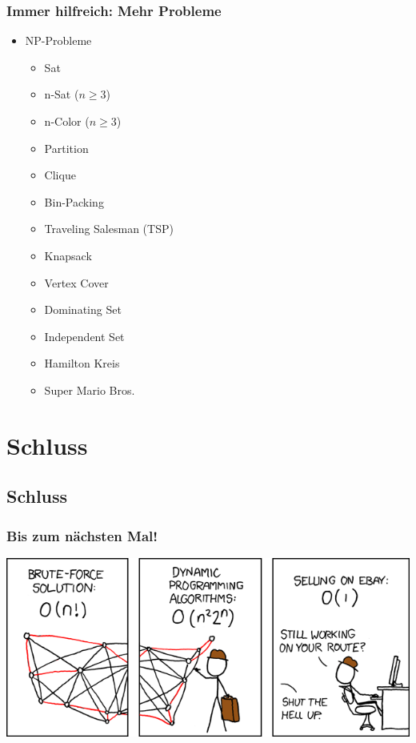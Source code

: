 \begin{frame}
	\frametitle{Immer hilfreich: Mehr Probleme}
	\begin{itemize}
		\item NP-Probleme
		\begin{itemize}
			\item Sat
			\item n-Sat ($n \geq 3$)
			\item n-Color ($n \geq 3$)
			\item Partition
			\item Clique
			\item Bin-Packing
			\item Traveling Salesman (TSP)
			\item Knapsack
			\item Vertex Cover
			\item Dominating Set
			\item Independent Set
			\item Hamilton Kreis
			\item Super Mario Bros.
		\end{itemize}
	\end{itemize}
\end{frame}
\section{Schluss}
\subsection{Schluss}
\begin{frame}
\frametitle{Bis zum nächsten Mal!}
\begin{center}
	\includegraphics[width= \textwidth]{images/399_traveling_salesman}
\end{center}
\end{frame}

